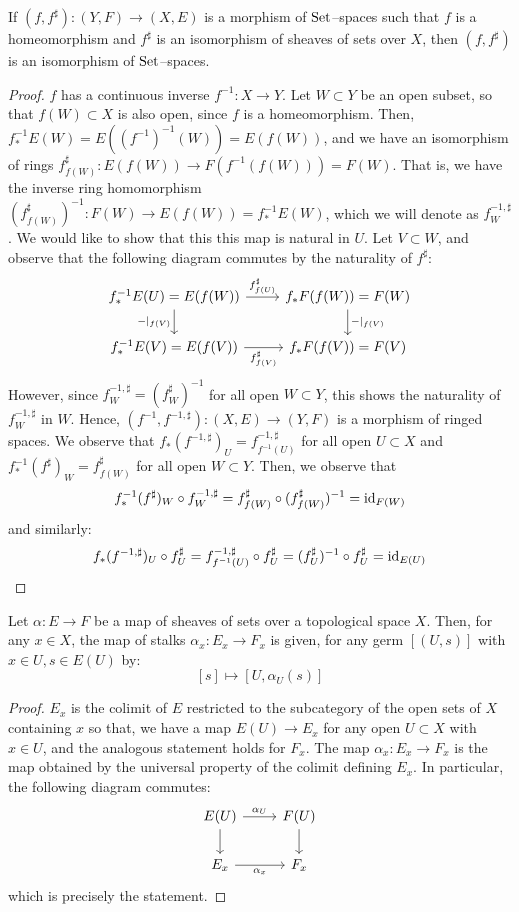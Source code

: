 \begin{lem}\label{lem:set-sp-iso}
If $(f, f^\sharp) : (Y, F) \to (X, E)$ is a morphism of $\mathrm{Set}$--spaces
such that $f$ is a homeomorphism and $f^\sharp$ is an isomorphism
of sheaves of sets over $X$, then $(f, f^\sharp)$ is an isomorphism
of $\mathrm{Set}$--spaces.
\end{lem}
\begin{proof}
$f$ has a continuous inverse $f^{-1} : X \to Y$. Let $W \subset Y$
be an open subset, so that $f(W) \subset X$ is also open, since $f$
is a homeomorphism. Then, $f^{-1}_*E(W) = E((f^{-1})^{-1}(W)) = E(f(W))$,
and we have an isomorphism of rings
$f^\sharp_{f(W)} : E(f(W)) \to F(f^{-1}(f(W))) = F(W)$. That is, we have the
inverse ring homomorphism
$(f^\sharp_{f(W)})^{-1} : F(W) \to E(f(W)) = f^{-1}_*E(W)$, which
we will denote as $f^{-1, \sharp}_W$. We would like to show that this
this map is natural in $U$. Let $V \subset W$, and observe that
the following diagram commutes by the naturality of $f^\sharp$:
\[\begin{tikzcd}
f^{-1}_*E(U) = E(f(W)) \ar[r, "f^\sharp_{f(U)}"] \ar[d, "-|_{f(V)}" left] &
f_*F(f(W)) = F(W) \ar[d, "-|_{f(V)}"] \\
f^{-1}_*E(V) = E(f(V)) \ar[r, "f^\sharp_{f(V)}" below] & f_*F(f(V)) = F(V)
\end{tikzcd}\]
However, since $f^{-1, \sharp}_W = (f^\sharp_W)^{-1}$ for all open
$W \subset Y$, this shows the naturality of $f^{-1, \sharp}_W$
in $W$. Hence, $(f^{-1}, f^{-1, \sharp}) : (X, E) \to (Y, F)$
is a morphism of ringed spaces. We observe that
$f_*(f^{-1, \sharp})_U = f^{-1, \sharp}_{f^{-1}(U)}$ for all
open $U \subset X$
and $f^{-1}_*(f^\sharp)_W = f^\sharp_{f(W)}$
for all open $W \subset Y$.
Then, we observe that
\[
f^{-1}_*(f^\sharp)_W \circ f^{-1, \sharp}_W
= f^{\sharp}_{f(W)} \circ (f^\sharp_{f(W)})^{-1}
= \mathrm{id}_{F(W)}
\]
and similarly:
\[
f_*(f^{-1, \sharp})_U \circ f^\sharp_U
= f^{-1, \sharp}_{f^{-1}(U)} \circ f^\sharp_U
= (f^{\sharp}_{U})^{-1} \circ f^\sharp_U
= \mathrm{id}_{E(U)}
\]
\end{proof}

\begin{lem}\label{lem:sheaf-map-localization}
Let $\alpha : E \to F$ be a map of sheaves of sets over a topological
space $X$. Then, for any $x \in X$, the map of stalks
$\alpha_x : E_x \to F_x$ is given, for any germ $[(U, s)]$ with
$x \in U, s \in E(U)$ by:
\[
[s] \mapsto {[U, \alpha_U(s)]}
\]
\end{lem}
\begin{proof}
$E_x$ is the colimit of $E$ restricted
to the subcategory of the open sets of $X$ containing $x$ so that,
we have a map $E(U) \to E_x$ for any open $U \subset X$ with $x \in U$,
and the analogous statement holds for $F_x$.
The map $\alpha_x : E_x \to F_x$ is the map obtained by the universal
property of the colimit defining $E_x$. In particular, the following
diagram commutes:
\[\begin{tikzcd}
E(U) \ar[r, "\alpha_U"] \ar[d] & F(U) \ar[d] \\
E_x \ar[r, "\alpha_x" below] & F_x
\end{tikzcd}\]
which is precisely the statement.
\end{proof}



